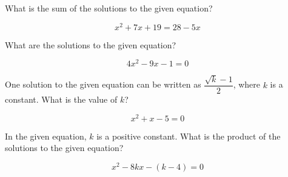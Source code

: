 \vspace{2em}

\noindent\markforreview
\vspace{1em}

What is the sum of the solutions to the given equation?

\[
x^2 + 7x + 19 = 28 - 5x
\]

\vspace{0.75em}


\vspace{2em}

\noindent\markforreview
\vspace{1em}

What are the solutions to the given equation?

\[
4x^2 - 9x - 1 = 0
\]

\vspace{0.75em}


\vspace{2em}

\noindent\markforreview
\vspace{1em}

One solution to the given equation can be written as $\dfrac{\sqrt{k} - 1}{2}$, where $k$ is a constant. What is the value of $k$?

\[
x^2 + x - 5 = 0
\]

\vspace{2em}

\noindent\markforreview
\vspace{1em}

In the given equation, $k$ is a positive constant. What is the product of the solutions to the given equation?

\[
x^2 - 8kx - (k - 4) = 0
\]

\vspace{0.75em}


\vspace{2em}

\noindent\markforreview
\vspace{1em}


